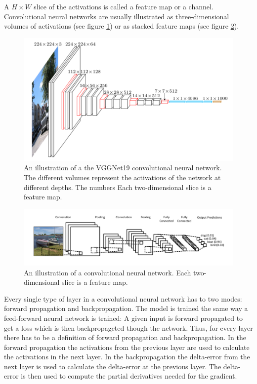 \documentclass[a4paper, twoside]{article}
\begin{document}
A $H \times W$ slice of the activations is called a feature map or a channel. Convolutional neural networks are usually illustrated as three-dimensional volumes of activations (see figure \ref{figvgg}) or as stacked feature maps (see figure \ref{figboatcnn}). \cite{cs231n} \cite{convmath} \cite{convarithmetic}

\begin{figure}[h]
	\centering
  		\includegraphics[scale=0.6]{vggnet.png}
  	\caption{An illustration of a the VGGNet19 convolutional neural network. The different volumes represent the activations of the network at different depths. The numbers  Each two-dimensional slice is a feature map. \cite{vgg}} \label{figvgg}
\end{figure}

\begin{figure}[h]
	\centering
  		\includegraphics[scale=0.6]{boatcnn.png}
  	\caption{An illustration of a convolutional neural network. Each two-dimensional slice is a feature map. \cite{figkonv}}\label{figboatcnn}
\end{figure}

Every single type of layer in a convolutional neural network has to two modes: forward propagation and backpropagation. The model is trained the same way a feed-forward neural network is trained: A given input is forward propagated to get a loss which is then backpropageted though the network. Thus, for every layer there has to be a definition of forward propagation and backpropagation. In the forward propagation the activations from the previous layer are used to calculate the activations in the next layer. In the backpropagation the delta-error from the next layer is used to calculate the delta-error at the previous layer. The delta-error is then used to compute the partial derivatives needed for the gradient. \cite{cs231n} \cite{convmath}
\end{document}
